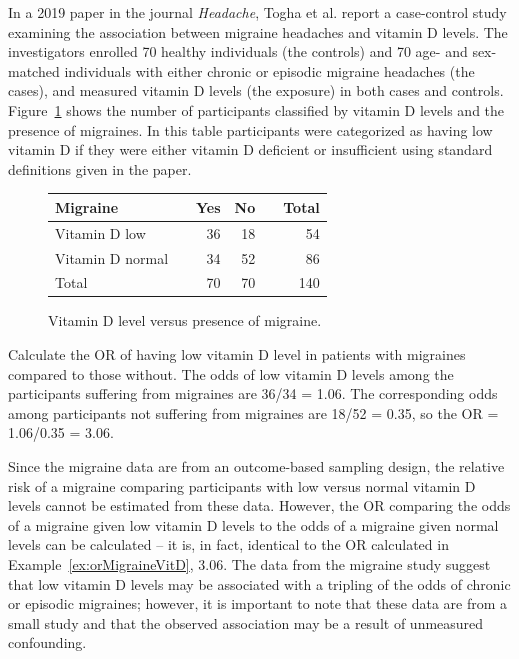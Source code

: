 In a 2019 paper in the journal \textit{Headache}, Togha et al. report a case-control study examining the association between migraine headaches and vitamin D levels.  The investigators enrolled 70 healthy individuals (the controls) and 70 age- and sex-matched individuals with either chronic or episodic migraine headaches (the cases), and measured vitamin D levels (the exposure) in both cases and controls.  Figure~\ref{figure:migraineVitD} shows the number of participants classified by vitamin D levels and the presence of migraines. In this table participants were categorized as having low vitamin D if they were either vitamin D deficient or insufficient using standard definitions given in the paper.

\begin{figure}[h]
	\centering
	\begin{tabular}{ll rrr r}
		\hline
		Migraine	 & \hspace{2mm} & Yes & No & \hspace{2mm} & Total \\
		\hline
		Vitamin D low & & 36 & 18  &  & 54  \\
		Vitamin D normal &	& 34 & 52 &  & 86  \\
        Total & & 70 & 70 & & 140 \\
		\hline
	\end{tabular}
	\caption{Vitamin D level versus presence of migraine.}
    \label{figure:migraineVitD}
\end{figure}

\begin{examplewrap}
  \begin{nexample}{Calculate the OR of having low vitamin D level in patients with migraines compared to those without.} \label{ex:orMigraineVitD}
  The odds of low vitamin D levels among the participants suffering from migraines are 36/34 = 1.06.  The corresponding odds among participants not suffering from migraines are 18/52 = 0.35, so the OR = 1.06/0.35 = 3.06.
\end{nexample}
\end{examplewrap}

Since the migraine data are from an outcome-based sampling design, the relative risk of a migraine comparing participants with low versus normal vitamin D levels cannot be estimated from these data. However, the OR comparing the odds of a migraine given low vitamin D levels to the odds of a migraine given normal levels can be calculated -- it is, in fact, identical to the OR calculated in Example~\ref{ex:orMigraineVitD}, 3.06. The data from the migraine study suggest that low vitamin D levels may be associated with a tripling of the odds of chronic or episodic migraines; however, it is important to note that these data are from a small study and that the observed association may be a result of unmeasured confounding.

